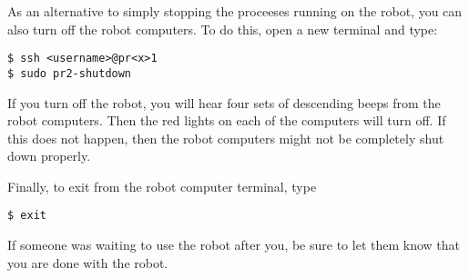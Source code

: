 As an alternative to simply stopping the proceeses running on the robot, you can also turn off the robot computers. To do this, open a new terminal and type:
\begin{verbatim}
$ ssh <username>@pr<x>1
$ sudo pr2-shutdown
\end{verbatim}

If you turn off the robot, you will hear four sets of descending beeps from the robot computers. Then the red lights on each of the computers will turn off. If this does not happen, then the robot computers might not be completely shut down properly.

Finally, to exit from the robot computer terminal, type
\begin{verbatim}
$ exit
\end{verbatim}

If someone was waiting to use the robot after you, be sure to let them know that you are done with the robot.
